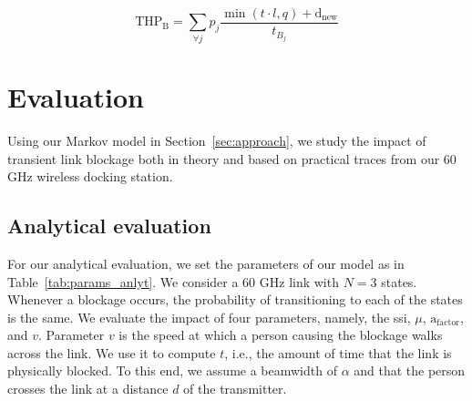 \documentclass{article}
\begin{document}
\vspace{-0.7mm}
\begin{equation}	
	\text{THP}_\text{B} = \displaystyle\sum_{\forall j} p_j \frac{\min(t \cdot l, q) + \text{d}_\text{new}}{t_{B_j}}
\label{equ:thp_blocked}
\end{equation}




\section{Evaluation}
\label{sec:results}

Using our Markov model in Section~\ref{sec:approach}, we study the impact of transient link blockage both in theory and based on practical traces from our 60 GHz wireless docking station.



\subsection{Analytical evaluation}

For our analytical evaluation, we set the parameters of our model as in Table~\ref{tab:params_anlyt}. We consider a 60 GHz link with $N = 3$ states. Whenever a blockage occurs, the probability of transitioning to each of the states is the same. We evaluate the impact of four parameters, namely, the \ac{ssi}, $\mu$, $\text{a}_\text{factor}$, and $v$. Parameter $v$ is the speed at which a person causing the blockage walks across the link. We use it to compute $t$, i.e., the amount of time that the link is physically blocked. To this end, we assume a beamwidth of $\alpha$ and that the person crosses the link at a distance $d$ of the transmitter.
\end{document}
